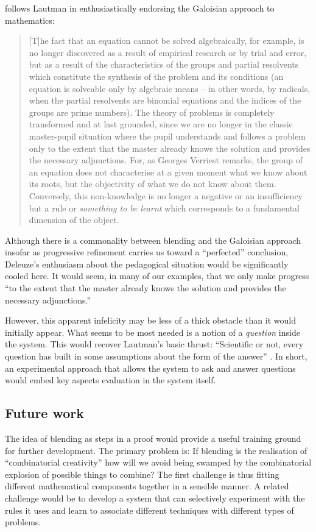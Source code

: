 \cite[pp. 227--228]{deleuze1994difference} follows
Lautman in enthusiastically endorsing the Galoisian approach to
mathematics:
\begin{quote}
[T]he fact that an equation cannot be solved algebraically, for
example, is no longer discovered as a result of empirical research or
by trial and error, but as a result of the characteristics of the
groups and partial resolvents which constitute the synthesis of the
problem and its conditions (an equation is solveable only by algebraic
means -- in other words, by radicals, when the partial resolvents are
binomial equations and the indices of the groups are prime numbers).
The theory of problems is completely transformed and at last grounded,
since we are no longer in the classic master-pupil situation where the
pupil understands and follows a problem only to the extent that the
master already knows the solution and provides the necessary
adjunctions.  For, as Georges Verriest remarks, the group of an
equation does not characterise at a given moment what we know about
its roots, but the objectivity of what we do not know about them.
Conversely, this non-knowledge is no longer a negative or an
insufficiency but a rule or \emph{something to be learnt} which
corresponds to a fundamental dimension of the object.
\end{quote}

Although there is a commonality between blending and the
Galoisian approach insofar as progressive refinement carries us toward a
``perfected'' conclusion, Deleuze's enthusiasm about the pedagogical
situation would be significantly cooled here.  It would seem, in many
of our examples, that we only make progress ``to the extent that the
master already knows the solution and provides the necessary
adjunctions.''

However, this apparent infelicity may be less of a thick obstacle than
it would initially appear.  What seems to be most needed is a notion of a \emph{question} inside the system.  This would recover Lautman's basic
thrust: ``Scientific or not, every question has built in some
assumptions about the form of the answer'' \cite{larvor2011albert}.
In short, an experimental approach that allows the system to ask
and answer questions would embed key aspects evaluation in the system itself.

\subsection{Future work}

The idea of blending as steps in a proof would provide a useful
training ground for further development.  The primary problem is: If
blending is the realisation of ``combinatorial creativity'' how will
we avoid being swamped by the combinatorial explosion of possible
things to combine?  The first challenge is thus fitting different
mathematical components together in a sensible manner.  A related
challenge would be to develop a system that can selectively experiment
with the rules it uses and learn to associate different techniques
with different types of problems.

